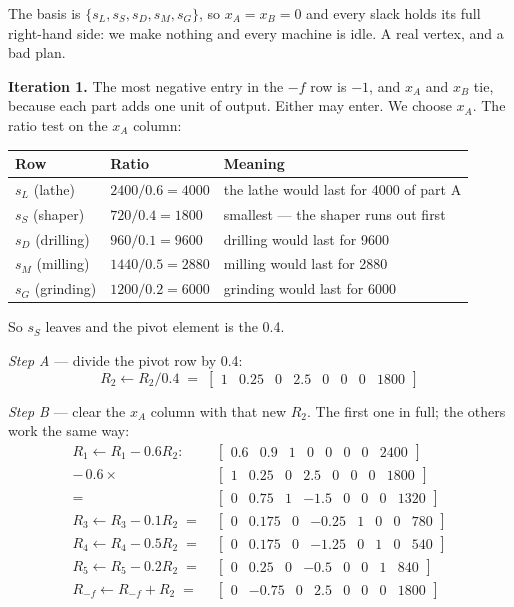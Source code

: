 \documentclass[11pt,a4paper]{article}
\newcommand{\rowv}[1]{\left[\begin{array}{VVVVVVV|V}#1\end{array}\right]}
\begin{document}
The basis is $\{s_L, s_S, s_D, s_M, s_G\}$, so $x_A = x_B = 0$ and every slack
holds its full right-hand side: we make nothing and every machine is idle. A
real vertex, and a bad plan.

\textbf{Iteration 1.} The most negative entry in the $-f$ row is $-1$, and $x_A$
and $x_B$ tie, because each part adds one unit of output. Either may enter. We
choose $x_A$. The ratio test on the $x_A$ column:

\begin{center}
\begin{tabular}{lll}
\toprule
Row & Ratio & Meaning \\
\midrule
$s_L$ (lathe)    & $2400/0.6 = 4000$ & the lathe would last for 4000 of part A \\
$s_S$ (shaper)   & $720/0.4 = 1800$  & smallest --- the shaper runs out first \\
$s_D$ (drilling) & $960/0.1 = 9600$  & drilling would last for 9600 \\
$s_M$ (milling)  & $1440/0.5 = 2880$ & milling would last for 2880 \\
$s_G$ (grinding) & $1200/0.2 = 6000$ & grinding would last for 6000 \\
\bottomrule
\end{tabular}
\end{center}

So $s_S$ leaves and the pivot element is the 0.4.

\emph{Step A} --- divide the pivot row by 0.4:
\[
  R_2 \leftarrow R_2/0.4 \;=\; \rowv{1 & 0.25 & 0 & 2.5 & 0 & 0 & 0 & 1800}
\]

\emph{Step B} --- clear the $x_A$ column with that new $R_2$. The first one in
full; the others work the same way:
\begin{align*}
  R_1 \leftarrow R_1 - 0.6R_2: \quad
  & \rowv{0.6 & 0.9 & 1 & 0 & 0 & 0 & 0 & 2400} \\
  -\,0.6\times & \rowv{1 & 0.25 & 0 & 2.5 & 0 & 0 & 0 & 1800} \\
  = & \rowv{0 & 0.75 & 1 & -1.5 & 0 & 0 & 0 & 1320} \\
  R_3 \leftarrow R_3 - 0.1R_2 \;=\; & \rowv{0 & 0.175 & 0 & -0.25 & 1 & 0 & 0 & 780} \\
  R_4 \leftarrow R_4 - 0.5R_2 \;=\; & \rowv{0 & 0.175 & 0 & -1.25 & 0 & 1 & 0 & 540} \\
  R_5 \leftarrow R_5 - 0.2R_2 \;=\; & \rowv{0 & 0.25 & 0 & -0.5 & 0 & 0 & 1 & 840} \\
  R_{-f} \leftarrow R_{-f} + R_2 \;=\; & \rowv{0 & -0.75 & 0 & 2.5 & 0 & 0 & 0 & 1800}
\end{align*}
\end{document}
